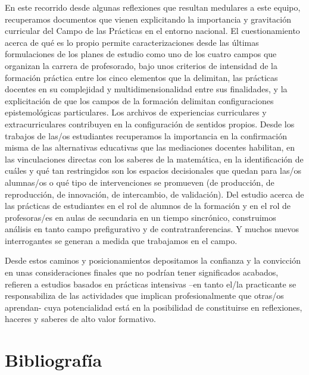 \documentclass[oneside,spanish]{amsart}
\numberwithin{equation}{section}
\numberwithin{figure}{section}
\theoremstyle{definition}
\begin{document}
En este recorrido desde algunas reflexiones que resultan medulares a este equipo, recuperamos documentos que vienen explicitando la importancia y gravitación curricular del Campo de las Prácticas en el entorno nacional. El cuestionamiento acerca de qué es lo propio permite caracterizaciones desde las últimas formulaciones de los planes de estudio como uno de los cuatro campos que organizan la carrera de profesorado, bajo unos criterios de intensidad de la formación práctica entre los cinco elementos que la delimitan, las prácticas docentes en su complejidad y multidimensionalidad entre sus finalidades, y la explicitación de que los campos de la formación delimitan configuraciones epistemológicas particulares. Los archivos de experiencias curriculares y extracurriculares contribuyen en la configuración de sentidos propios. Desde los trabajos de las/os estudiantes recuperamos la importancia en la confirmación misma de las alternativas educativas que las mediaciones docentes habilitan, en las vinculaciones directas con los saberes de la matemática, en la identificación de cuáles y qué tan restringidos son los espacios decisionales que quedan para las/os alumnas/os o qué tipo de intervenciones se promueven (de producción, de reproducción, de innovación, de intercambio, de validación). Del estudio acerca de las prácticas de estudiantes en el rol de alumnos de la formación y en el rol de profesoras/es en aulas de secundaria en un tiempo sincrónico, construimos análisis en tanto campo prefigurativo y de contratranferencias. Y muchos nuevos interrogantes se generan a medida que trabajamos en el campo. 

Desde estos caminos y posicionamientos depositamos la confianza y la convicción en unas consideraciones finales que no podrían tener significados acabados, refieren a estudios basados en prácticas intensivas --en tanto el/la practicante se responsabiliza de las actividades que implican profesionalmente que otras/os aprendan- cuya potencialidad está en la posibilidad de constituirse en reflexiones, haceres y saberes de alto valor formativo.

\section{Bibliografía}

\nocite{*}
\printbibliography
\end{document}
